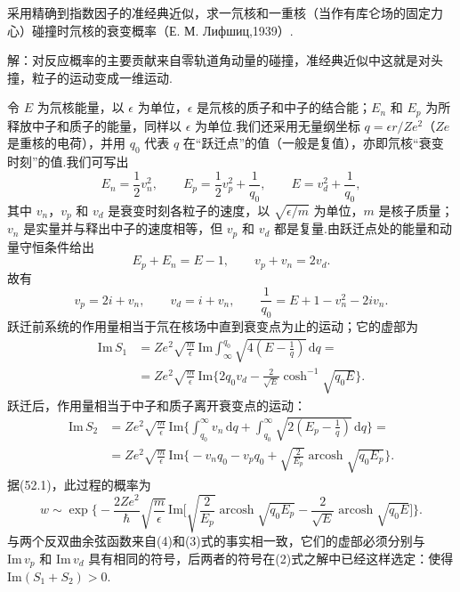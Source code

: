 \begin{xiti}

\quad 采用精确到指数因子的准经典近似，求一氘核和一重核（当作有库仑场的固定力心）碰撞时氘核的衰变概率（Е. М. Лифшиц,1939）.

解：对反应概率的主要贡献来自零轨道角动量的碰撞，准经典近似中这就是对头撞，粒子的运动变成一维运动.

令 $E$ 为氘核能量，以 $\epsilon$ 为单位，$\epsilon$ 是氘核的质子和中子的结合能；$E_n$ 和 $E_p$ 为所释放中子和质子的能量，同样以 $\epsilon$ 为单位.我们还采用无量纲坐标 $q=\epsilon r/Ze^2$（$Ze$ 是重核的电荷），并用 $q_0$ 代表 $q$ 在“跃迁点”的值（一般是复值），亦即氘核“衰变时刻”的值.我们可写出
\setcounter{equation}{0}\renewcommand{\theequation}{\arabic{equation}}%
\begin{equation}
  E_n=\frac{1}{2}v_n^2,\qquad
  E_p=\frac{1}{2}v_p^2+\frac{1}{q_0},\qquad
  E=v_d^2+\frac{1}{q_0},
\end{equation}
其中 $v_n$，$v_p$ 和 $v_d$ 是衰变时刻各粒子的速度，以 $\sqrt{\epsilon/m}$ 为单位，$m$ 是核子质量；$v_n$ 是实量并与释出中子的速度相等，但 $v_p$ 和 $v_d$ 都是复量.由跃迁点处的能量和动量守恒条件给出
\begin{equation}
  E_p+E_n=E-1,\qquad v_p+v_n=2v_d.
\end{equation}
故有
\begin{equation*}
  v_p=2i+v_n,\qquad v_d=i+v_n,\qquad
  \frac{1}{q_0}=E+1-v_n^2-2iv_n.
\end{equation*}
跃迁前系统的作用量相当于氘在核场中直到衰变点为止的运动；它的虚部为
\begin{equation}
\begin{aligned}
  \mathrm{Im}\,S_1&=Ze^2\sqrt{\frac{m}{\epsilon}}\,
  \mathrm{Im}\int_{\infty}^{q_0}\sqrt{4\left(E-\frac{1}{q}\right)}\,\mathrm{d}q=\\
  &=Ze^2\sqrt{\frac{m}{\epsilon}}\,
  \mathrm{Im}\bigg\{2q_0v_d-\frac{2}{\sqrt{E}}\cosh^{-1}\sqrt{q_0E}\bigg\}.
\end{aligned}
\end{equation}
跃迁后，作用量相当于中子和质子离开衰变点的运动：
\begin{equation}
\begin{aligned}
  \mathrm{Im}\,S_2&=Ze^2\sqrt{\frac{m}{\epsilon}}\,
  \mathrm{Im}\bigg\{\int_{q_0}^{\infty}v_n\,\mathrm{d}q
  +\int_{q_0}^{\infty}\sqrt{2\left(E_p-\frac{1}{q}\right)}\,\mathrm{d}q\bigg\}=\\
  &=Ze^2\sqrt{\frac{m}{\epsilon}}\,
  \mathrm{Im}\bigg\{-v_nq_0-v_pq_0
  +\sqrt{\frac{2}{E_p}}\operatorname{arcosh}\sqrt{q_0E_p}\bigg\}.
\end{aligned}
\end{equation}
据(52.1)，此过程的概率为
\begin{equation}
  w\sim\exp\bigg\{-\frac{2Ze^2}{\hbar}\sqrt{\frac{m}{\epsilon}}\,
  \mathrm{Im}\bigg[\sqrt{\frac{2}{E_p}}\operatorname{arcosh}\sqrt{q_0E_p}
  -\frac{2}{\sqrt{E}}\operatorname{arcosh}\sqrt{q_0E}\bigg]\bigg\}.
\end{equation}
与两个反双曲余弦函数来自(4)和(3)式的事实相一致，它们的虚部必须分别与 $\mathrm{Im}\,v_p$ 和 $\mathrm{Im}\,v_d$ 具有相同的符号，后两者的符号在(2)式之解中已经这样选定：使得 $\mathrm{Im}(S_1+S_2)>0$.


\end{xiti}
